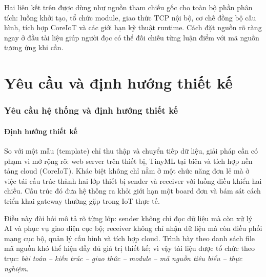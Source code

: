 \documentclass[12pt,a4paper]{report}
\begin{document}
Hai liên kết trên được dùng như nguồn tham chiếu gốc cho toàn bộ phần phân tích: luồng khởi tạo, tổ chức module, giao thức TCP nội bộ, cơ chế đồng bộ cấu hình, tích hợp CoreIoT và các giới hạn kỹ thuật runtime. Cách đặt nguồn rõ ràng ngay ở đầu tài liệu giúp người đọc có thể đối chiếu từng luận điểm với mã nguồn tương ứng khi cần.


\part{Yêu cầu và định hướng thiết kế}

\section{Yêu cầu hệ thống và định hướng thiết kế}

\subsection{Định hướng thiết kế}
So với một mẫu (template) chỉ thu thập và chuyển tiếp dữ liệu, giải pháp cần có phạm vi mở rộng rõ: web server trên thiết bị, TinyML tại biên và tích hợp nền tảng cloud (CoreIoT). Khác biệt không chỉ nằm ở một chức năng đơn lẻ mà ở việc tái cấu trúc thành hai lớp thiết bị sender và receiver với luồng điều khiển hai chiều. Cấu trúc đó đưa hệ thống ra khỏi giới hạn một board đơn và bám sát cách triển khai gateway thường gặp trong IoT thực tế.

Điều này đòi hỏi mô tả rõ từng lớp: sender không chỉ đọc dữ liệu mà còn xử lý AI và phục vụ giao diện cục bộ; receiver không chỉ nhận dữ liệu mà còn điều phối mạng cục bộ, quản lý cấu hình và tích hợp cloud. Trình bày theo danh sách file mã nguồn khó thể hiện đầy đủ giá trị thiết kế; vì vậy tài liệu được tổ chức theo trục: \textit{bài toán -- kiến trúc -- giao thức -- module -- mã nguồn tiêu biểu -- thực nghiệm}.
\end{document}
